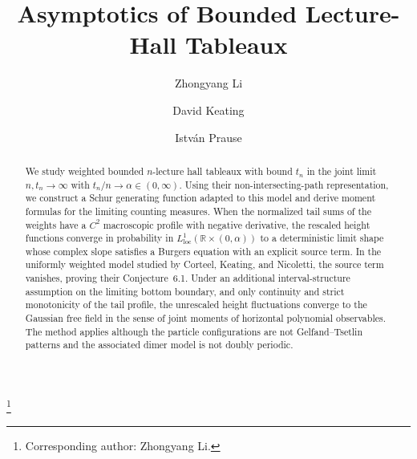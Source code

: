 \documentclass[11pt]{amsart}
\theoremstyle{plain}
\numberwithin{equation}{section}
\numberwithin{theorem}{section}
\numberwithin{figure}{section}
\begin{document}
\title{Asymptotics of Bounded Lecture-Hall Tableaux}
\author{Zhongyang Li}
\address{Department of Mathematics, University of Connecticut,
341 Mansfield Road, Unit 1009, Storrs, CT 06269-1009, USA}
\thanks{Corresponding author: Zhongyang Li.}
\author{David Keating}
\address{Department of Mathematics, University of Massachusetts Boston,
100 William T. Morrissey Boulevard, Boston, MA 02125, USA}
\author{Istv\'an Prause}
\address{Mathematics, Faculty of Science and Engineering,
{\AA}bo Akademi University, 20500 Turku, Finland}



\date{}

\begin{abstract}
We study weighted bounded \(n\)-lecture hall tableaux with bound \(t_n\)
in the joint limit \(n,t_n\to\infty\) with
\(t_n/n\to\alpha\in(0,\infty)\). Using their non-intersecting-path
representation, we construct a Schur generating function adapted to this
model and derive moment formulas for the limiting counting measures.
When the normalized tail sums of the weights have a
\(C^2\) macroscopic profile with negative derivative, the rescaled
height functions converge in probability in
\(L^1_{\mathrm{loc}}(\mathbb R\times(0,\alpha))\) to a deterministic
limit shape whose complex slope
satisfies a
Burgers equation with an explicit source term.
In the uniformly weighted model studied by Corteel,
Keating, and Nicoletti, the source term vanishes, proving their
Conjecture~6.1. Under an additional interval-structure
assumption on the limiting bottom boundary, and only continuity and strict
monotonicity of the tail profile, the unrescaled height fluctuations converge to the Gaussian free field
in the sense of joint moments of horizontal polynomial observables. The method applies although the
particle configurations are not Gelfand--Tsetlin patterns and the associated
dimer model is not doubly periodic.
\end{abstract}

\maketitle
\end{document}
